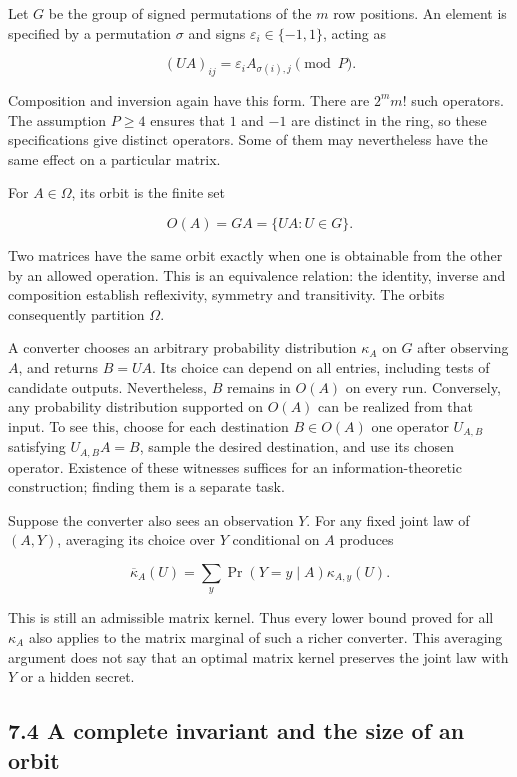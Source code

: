 \documentclass[
]{article}
\begin{document}
Let \(G\) be the group of signed permutations of the \(m\) row
positions. An element is specified by a permutation \(\sigma\) and signs
\(\varepsilon_i\in\{-1,1\}\), acting as

\[
(UA)_{ij}=\varepsilon_i A_{\sigma(i),j}\pmod P.
\]

Composition and inversion again have this form. There are \(2^m m!\)
such operators. The assumption \(P\ge4\) ensures that \(1\) and \(-1\)
are distinct in the ring, so these specifications give distinct
operators. Some of them may nevertheless have the same effect on a
particular matrix.

For \(A\in\Omega\), its orbit is the finite set

\[
O(A)=GA=\{UA:U\in G\}.
\]

Two matrices have the same orbit exactly when one is obtainable from the
other by an allowed operation. This is an equivalence relation: the
identity, inverse and composition establish reflexivity, symmetry and
transitivity. The orbits consequently partition \(\Omega\).

A converter chooses an arbitrary probability distribution \(\kappa_A\)
on \(G\) after observing \(A\), and returns \(B=UA\). Its choice can
depend on all entries, including tests of candidate outputs.
Nevertheless, \(B\) remains in \(O(A)\) on every run. Conversely, any
probability distribution supported on \(O(A)\) can be realized from that
input. To see this, choose for each destination \(B\in O(A)\) one
operator \(U_{A,B}\) satisfying \(U_{A,B}A=B\), sample the desired
destination, and use its chosen operator. Existence of these witnesses
suffices for an information-theoretic construction; finding them is a
separate task.

Suppose the converter also sees an observation \(Y\). For any fixed
joint law of \((A,Y)\), averaging its choice over \(Y\) conditional on
\(A\) produces

\[
\overline\kappa_A(U)
=\sum_y\Pr(Y=y\mid A)\kappa_{A,y}(U).
\]

This is still an admissible matrix kernel. Thus every lower bound proved
for all \(\kappa_A\) also applies to the matrix marginal of such a
richer converter. This averaging argument does not say that an optimal
matrix kernel preserves the joint law with \(Y\) or a hidden secret.

\subsection{7.4 A complete invariant and the size of an
orbit}\label{a-complete-invariant-and-the-size-of-an-orbit}
\end{document}
